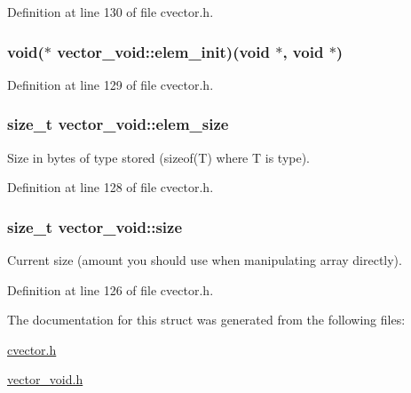Definition at line 130 of file cvector.\-h.

\hypertarget{structvector__void_af5d27d7e1af89d5dfbcf49f1810cc0c2}{
\subsubsection[{elem\-\_\-init}]{\setlength{\rightskip}{0pt plus 5cm}void($\ast$ vector\-\_\-void\-::elem\-\_\-init)(void $\ast$, void $\ast$)}}\label{structvector__void_af5d27d7e1af89d5dfbcf49f1810cc0c2}


Definition at line 129 of file cvector.\-h.

\hypertarget{structvector__void_afedda26ce85492462b79dae9090c49f6}{
\subsubsection[{elem\-\_\-size}]{\setlength{\rightskip}{0pt plus 5cm}size\-\_\-t vector\-\_\-void\-::elem\-\_\-size}}\label{structvector__void_afedda26ce85492462b79dae9090c49f6}


Size in bytes of type stored (sizeof(\-T) where T is type). 



Definition at line 128 of file cvector.\-h.

\hypertarget{structvector__void_a94e09482f6122993461724a988ae6f92}{
\subsubsection[{size}]{\setlength{\rightskip}{0pt plus 5cm}size\-\_\-t vector\-\_\-void\-::size}}\label{structvector__void_a94e09482f6122993461724a988ae6f92}


Current size (amount you should use when manipulating array directly). 



Definition at line 126 of file cvector.\-h.



The documentation for this struct was generated from the following files\-:\begin{DoxyCompactItemize}
\item 
\hyperlink{cvector_8h}{cvector.\-h}\item 
\hyperlink{vector__void_8h}{vector\-\_\-void.\-h}\end{DoxyCompactItemize}
